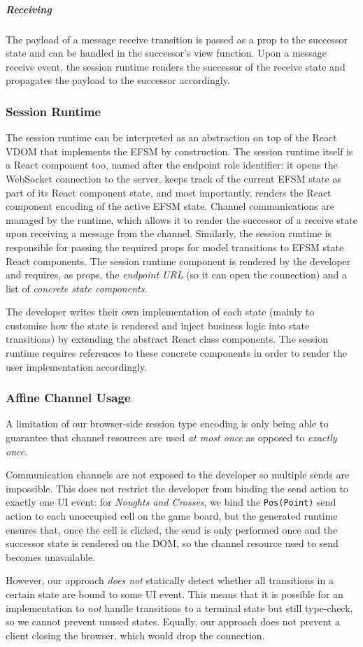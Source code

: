 \subparagraph{Receiving}
The payload of a message receive transition is passed as
a prop to the successor state and can be handled in the successor's view
function.
Upon a message receive event, the session runtime renders the
successor of the receive state and propagates the payload to the successor
accordingly.

\subsubsection{Session Runtime}
\label{section:clientruntime}

The session runtime can be interpreted as an abstraction on top of the React
VDOM that implements the EFSM by construction.
The session runtime itself is a React component too, named after the endpoint
role identifier:
it opens the WebSocket connection to the server, keeps track of the current
EFSM state as part of its React component state, and most importantly, renders
the React component encoding of the active EFSM state.
Channel communications are managed by the runtime, which allows it to render
the successor of a receive state upon receiving a message from the channel.
Similarly, the session runtime is responsible for passing the required props
for model transitions to EFSM state React components.
The session runtime component is rendered by the developer and requires, as
props, the \textit{endpoint URL} (so it can open the connection) and a list of
\textit{concrete state components}.

The developer writes their own implementation of each state (mainly to
customise how the state is rendered and inject business logic into state
transitions) by extending the abstract React class components.
The session runtime requires references to these concrete components in order to
render the user implementation accordingly.

\subsubsection{Affine Channel Usage}
A limitation of our browser-side session type encoding is only being able to
guarantee that channel resources are used \textit{at most once} as opposed to
\textit{exactly once}.

Communication channels are not exposed to the developer so multiple sends are
impossible.
This does not restrict the developer from binding the send action to exactly
one UI event: for \textit{Noughts and Crosses}, we bind the \texttt{Pos(Point)}
send action to each unoccupied cell on the game board, but the generated
runtime ensures that, once the cell is clicked, the send is only performed once
and the successor state is rendered on the DOM, so the channel resource used to
send becomes unavailable.

However, our approach \textit{does not} statically detect whether all
transitions in a certain state are bound to some UI event.
This means that it is possible for an implementation to \textit{not} handle
transitions to a terminal state but still type-check, so we cannot prevent
unused states. Equally, our approach does not prevent a client closing the browser, which would drop the connection.
